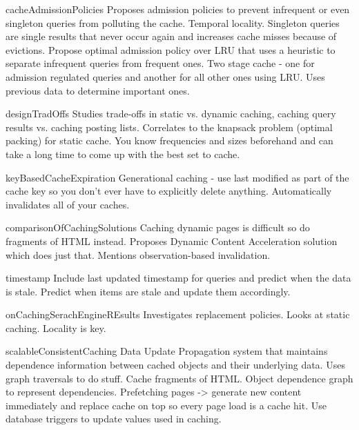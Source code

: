 \documentclass[12pt]{article}
\begin{document}
cacheAdmissionPolicies \cite{cacheAdmissionPolicies}
Proposes admission policies to prevent infrequent or even singleton queries from polluting the cache.
Temporal locality.
Singleton queries are single results that never occur again and increases cache misses because of evictions.
Propose optimal admission policy over LRU that uses a heuristic to separate infrequent queries from frequent ones.
Two stage cache - one for admission regulated queries and another for all other ones using LRU.
Uses previous data to determine important ones.

designTradOffs \cite{designTradeOffsSearchEngine}
Studies trade-offs in static vs. dynamic caching, caching query results vs. caching posting lists.
Correlates to the knapsack problem (optimal packing) for static cache.
You know frequencies and sizes beforehand and can take a long time to come up with the best set to cache.

keyBasedCacheExpiration \cite{keyBasedCacheExpiration}
Generational caching - use last modified as part of the cache key so you don't ever have to explicitly delete anything.
Automatically invalidates all of your caches.

comparisonOfCachingSolutions \cite{comparisonOfCachingSolutions}
Caching dynamic pages is difficult so do fragments of HTML instead.
Proposes Dynamic Content Acceleration solution which does just that.
Mentions observation-based invalidation.

timestamp \cite{timestampCacheInvalidation}
Include last updated timestamp for queries and predict when the data is stale.
Predict when items are stale and update them accordingly.

onCachingSerachEngineREsults \cite{onCachingSearchEngineResults}
Investigates replacement policies.
Looks at static caching.
Locality is key.

scalableConsistentCaching \cite{scalableConsistentCaching}
Data Update Propagation system that maintains dependence information between cached objects and their underlying data.
Uses graph traversals to do stuff.
Cache fragments of HTML.
Object dependence graph to represent dependencies.
Prefetching pages -> generate new content immediately and replace cache on top so every page load is a cache hit.
Use database triggers to update values used in caching.


\newpage
\nocite{*}


\end{document}

